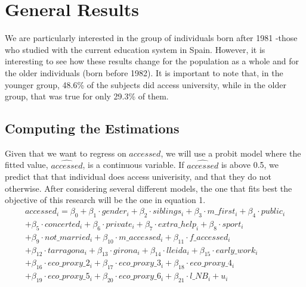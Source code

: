 \documentclass[12pt]{article}
\begin{document}
\section{General Results}
We are particularly interested in the group of individuals born after 1981 -those who studied with the current education system in Spain. However, it is interesting to see how these results change for the population as a whole and for the older individuals (born before 1982). It is important to note that, in the younger group, 48.6\% of the subjects did access university, while in the older group, that was true for only 29.3\% of them. 
\subsection{Computing the Estimations}
Given that we want to regress on $accessed$, we will use a probit model where the fitted value, $\widehat{accessed}$, is a continuous variable. If $\widehat{accessed}$ is above 0.5, we predict that that individual does access univerisity, and that they do not otherwise. After considering several different models, the one that fits best the objective of this research will be the one in equation 1.
\begin{align}
accessed_i = \beta_0 + \beta_1 \cdot gender_i + \beta_2  \cdot siblings_i + \beta_3 \cdot m\_{first}_i + \beta_4 \cdot public_i \nonumber \\
 + \beta_5 \cdot concerted_i + \beta_6 \cdot private_i + \beta_7 \cdot extra\_{help}_i + \beta_8 \cdot sport_i \nonumber \\
 + \beta_9 \cdot not\_{married}_i + \beta_{10} \cdot m\_{accessed}_i + \beta_{11} \cdot f\_{accessed}_i \nonumber \\
 + \beta_{12} \cdot tarragona_i + \beta_{13} \cdot girona_i + \beta_{14} \cdot lleida_i + \beta_{15} \cdot early\_{work}_i \\
 + \beta_{16} \cdot eco\_{proxy}\_{2}_i + \beta_{17} \cdot eco\_{proxy}\_{3}_i + \beta_{18} \cdot eco\_{proxy}\_{4}_i \nonumber \\
 + \beta_{19} \cdot eco\_{proxy}\_{5}_i + \beta_{20} \cdot eco\_{proxy}\_{6}_i + \beta_{21} \cdot l\_{NB}_i + u_i \nonumber
\end{align}
\end{document}
